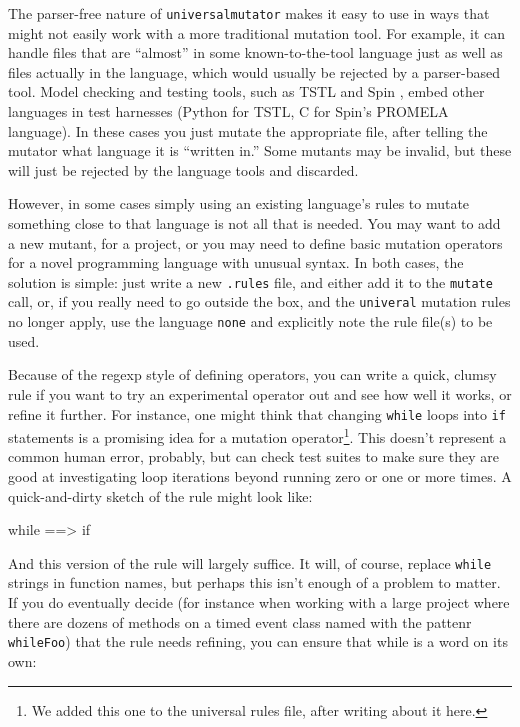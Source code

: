 The parser-free nature of {\tt universalmutator} makes it easy to
use in ways that might not easily
work with a more traditional mutation tool.  For example, it can
handle files that are ``almost'' in some known-to-the-tool language
just as well as files actually in the language, which would usually be
rejected by a parser-based tool.  Model checking and
testing tools, such as TSTL  and Spin \cite{SPIN}, embed other
languages in test harnesses (Python for TSTL, C for Spin's PROMELA
language).  In these cases you just mutate the appropriate file, after
telling the mutator what language it is ``written in.''  Some mutants
may be invalid, but these will just be rejected by the language tools
and discarded.

However, in some cases simply using an existing language's rules to
mutate something close to that language is not
all that is needed.  You may want to add a new mutant, for a project,
or you may need to define basic mutation operators for a novel
programming language with unusual syntax.  In both cases, the solution
is simple:  just write a new {\tt .rules} file, and either add it to
the {\tt mutate} call, or, if you really need to go outside the box,
and the {\tt univeral} mutation rules no longer apply, use the
language {\tt none} and explicitly note the rule file(s) to be used.

Because of the regexp style of defining operators, you can write a
quick, clumsy rule if you want to try an experimental operator out and
see how well it works, or refine it further.  For instance, one might
think that changing {\tt while} loops into {\tt if} statements is a
promising idea for a mutation operator\footnote{We added this one to
  the universal rules file, after writing about it here.}.  This doesn't represent a common human error,
probably, but can check test suites to make sure they are good at
investigating loop iterations beyond running zero or one or more
times.  A quick-and-dirty sketch of the rule might look like:

\begin{code}
while ==> if 
\end{code}

And this version of the rule will largely suffice.  It will, of
course, replace {\tt while} strings in function names, but perhaps
this isn't enough of a problem to matter.  If you do eventually decide (for instance when
working with a large project where there are dozens of methods on a
timed event class named with the pattenr {\tt whileFoo}) that the rule
needs refining, you can ensure that while is a word on its own:

